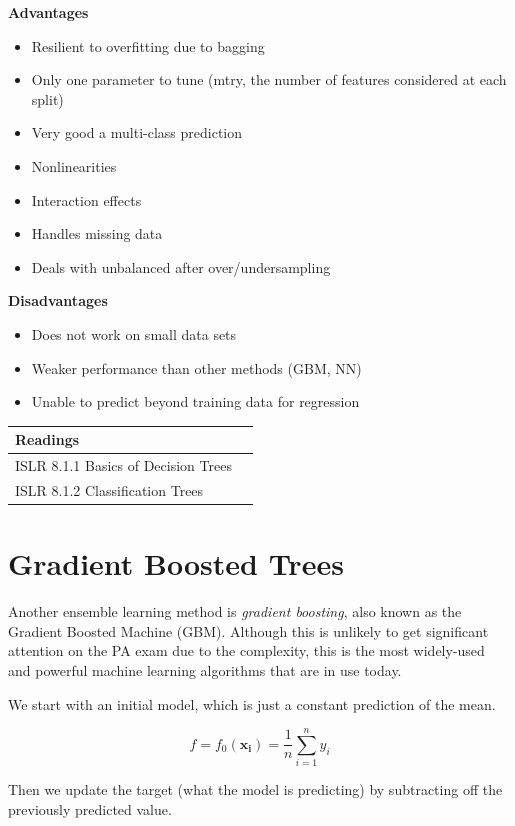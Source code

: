\documentclass[]{book}
\providecommand{\tightlist}{%
  \setlength{\itemsep}{0pt}\setlength{\parskip}{0pt}}
\begin{document}
\textbf{Advantages}

\begin{itemize}
\tightlist
\item
  Resilient to overfitting due to bagging
\item
  Only one parameter to tune (mtry, the number of features considered at each split)
\item
  Very good a multi-class prediction
\item
  Nonlinearities
\item
  Interaction effects
\item
  Handles missing data
\item
  Deals with unbalanced after over/undersampling
\end{itemize}

\textbf{Disadvantages}

\begin{itemize}
\tightlist
\item
  Does not work on small data sets
\item
  Weaker performance than other methods (GBM, NN)
\item
  Unable to predict beyond training data for regression
\end{itemize}

\begin{longtable}[]{@{}ll@{}}
\toprule
Readings &\tabularnewline
\midrule
\endhead
ISLR 8.1.1 Basics of Decision Trees &\tabularnewline
ISLR 8.1.2 Classification Trees &\tabularnewline
\bottomrule
\end{longtable}

\hypertarget{gradient-boosted-trees}{%
\section{Gradient Boosted Trees}\label{gradient-boosted-trees}}

Another ensemble learning method is \emph{gradient boosting}, also known as the Gradient Boosted Machine (GBM). Although this is unlikely to get significant attention on the PA exam due to the complexity, this is the most widely-used and powerful machine learning algorithms that are in use today.

We start with an initial model, which is just a constant prediction of the mean.

\[f = f_0(\mathbf{x_i}) = \frac{1}{n}\sum_{i=1}^ny_i\]

Then we update the target (what the model is predicting) by subtracting off the previously predicted value.
\end{document}
